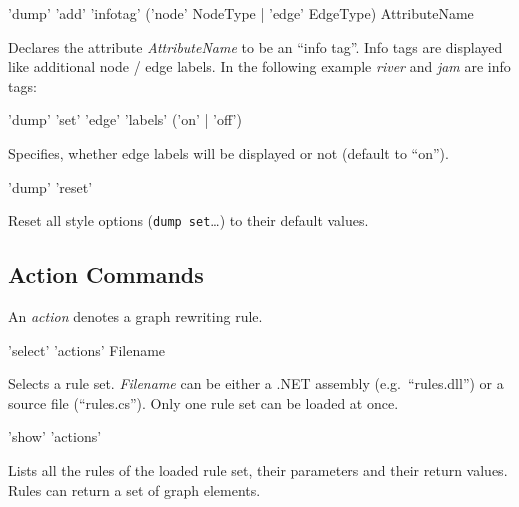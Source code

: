 \begin{rail}
  'dump' 'add' 'infotag' ('node' NodeType | 'edge' EdgeType) AttributeName
\end{rail}
Declares the attribute \emph{AttributeName} to be an ``info tag''. Info tags are displayed like additional node / edge labels. In the following example \emph{river} and \emph{jam} are info tags:
\begin{center}
\end{center}


\begin{rail}
  'dump' 'set' 'edge' 'labels' ('on' | 'off')
\end{rail}
Specifies, whether edge labels will be displayed or not (default to ``on'').

\begin{rail}
  'dump' 'reset'
\end{rail}
Reset all style options (\texttt{dump set}\dots) to their default values.

\subsection{Action Commands}
An \emph{action} denotes a graph rewriting rule.

\begin{rail}
  'select' 'actions' Filename
\end{rail}
Selects a rule set. \emph{Filename} can be either a .NET assembly (e.g.\ ``rules.dll'') or a source file (``rules.cs''). Only one rule set can be loaded at once.

\begin{rail}
  'show' 'actions'
\end{rail}
Lists all the rules of the loaded rule set, their parameters and their return values. Rules can return a set of graph elements.

